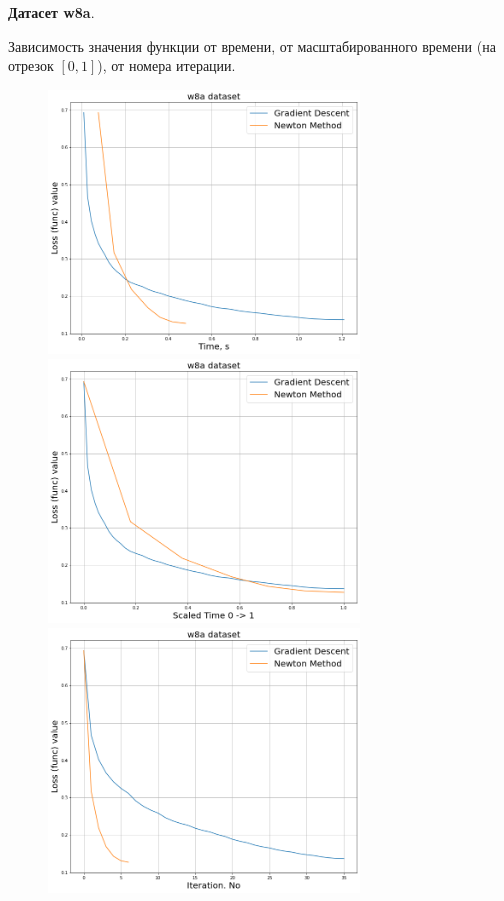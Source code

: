 \documentclass[14pt]{article}
\begin{document}
\newpage

\vspace{20pt} \textbf{Датасет w8a}.

Зависимость значения функции от времени, от масштабированного времени (на отрезок $[0, 1]$), от номера итерации.


\begin{figure}[h]
	\centering
	\includegraphics[height=7cm]{w8a_time.png}
	\includegraphics[height=7cm]{w8a_scale_time.png}
	\includegraphics[height=7cm]{w8a_time_no.png}
\end{figure}
\end{document}
